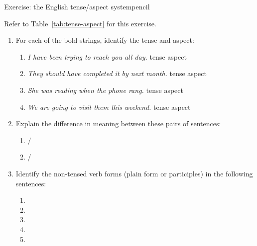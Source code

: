 \begin{tblsframedsymbol}{Exercise: the English tense/aspect system}{pencil}

Refer to Table~\ref{tab:tense-aspect} for this exercise.

\begin{enumerate}[noitemsep, leftmargin=*]
    \item For each of the bold strings, identify the tense and aspect:
    \begin{enumerate}[nosep]
        \item \textit{I \emph{have been} trying to reach you all day.} \hfill\gap{} tense \gap{} aspect
        \item \textit{They should \emph{have completed} it by next month.} \hfill\gap{} tense \gap{} aspect
        \item \textit{She \emph{was reading} when the phone rang.} \hfill\gap{} tense \gap{} aspect
        \item \textit{We \emph{are going} to visit them this weekend.} \hfill\gap{} tense \gap{} aspect
    \end{enumerate}

    \item Explain the difference in meaning between these pairs of sentences:
    \begin{enumerate}[nosep]
        \item {} / 
        \item {} / 
    \end{enumerate}

    \item Identify the non-tensed verb forms (plain form or participles) in the following sentences:
    \begin{enumerate}[nosep]
        \item {} \hfill\gap{} \gap
        \item {} \hfill\gap
        \item {} \hfill\gap
        \item {} \hfill\gap
        \item {} \hfill\gap{} \gap
    \end{enumerate}
\end{enumerate}

\end{tblsframedsymbol}


